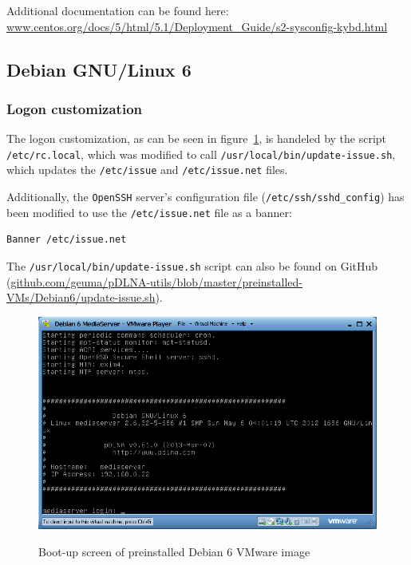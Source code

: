 \documentclass[a4paper,oneside,10pt]{report}
\newenvironment{colframefile}{%
  \begin{Sbox}
    \begin{minipage}{.99\columnwidth}
}{%
  \end{minipage}
  \end{Sbox}
  \begin{center}
    \fcolorbox{black}{Yellow}{\TheSbox}
  \end{center}
}
\begin{document}
Additional documentation can be found here: \url{www.centos.org/docs/5/html/5.1/Deployment_Guide/s2-sysconfig-kybd.html}

\subsection{Debian GNU/Linux 6}

\subsubsection{Logon customization}

The logon customization, as can be seen in figure~\ref{fig:debian6-loginscreen}, is handeled by the script \verb|/etc/rc.local|, which was modified to call \verb|/usr/local/bin/update-issue.sh|, which updates the \verb|/etc/issue| and \verb|/etc/issue.net| files.

Additionally, the \verb|OpenSSH| server's configuration file (\verb|/etc/ssh/sshd_config|) has been modified to use the \verb|/etc/issue.net| file as a banner:
\begin{colframefile}
\begin{verbatim}
Banner /etc/issue.net
\end{verbatim}
\end{colframefile}

The \verb|/usr/local/bin/update-issue.sh| script can also be found on GitHub (\url{github.com/geuma/pDLNA-utils/blob/master/preinstalled-VMs/Debian6/update-issue.sh}).

\begin{figure}
	\centering
		\includegraphics[width=34em]{images/vm_debian6_loginscreen}
	\label{fig:debian6-loginscreen}
	\caption{Boot-up screen of preinstalled Debian 6 VMware image}
\end{figure}
\end{document}
